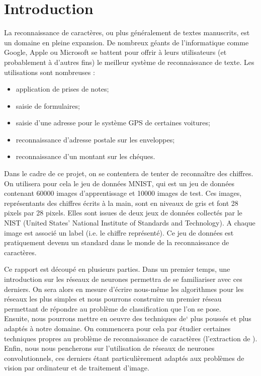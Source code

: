 
\chapter{Introduction}

La reconnaissance de caractères, ou plus généralement de textes manuscrits, est 
un domaine en pleine expansion. 
De nombreux géants de l'informatique comme Google, Apple ou Microsoft se battent pour 
offrir à leurs utilisateurs (et probablement à d'autres fins) le meilleur système 
de reconnaissance de texte. Les utilisations sont nombreuses :
\begin{itemize}
  \item application de prises de notes;
  \item saisie de formulaires;
  \item saisie d'une adresse pour le système GPS de certaines voitures;
  \item reconnaissance d'adresse postale sur les enveloppes;
  \item reconnaissance d'un montant sur les chéques.
\end{itemize}

\vspace{1em}

Dans le cadre de ce projet, on se contentera de tenter de reconnaître des chiffres. 
On utilisera pour cela le jeu de données MNIST, qui est un jeu de données contenant 
60000 images d'apprentissage et 10000 images de test. Ces images, représentants des 
chiffres écrits à la main, sont en niveaux de gris et font 28 pixels par 28 pixels.
Elles sont issues de deux jeux de données collectés par le NIST 
(United States' National Institute of Standards and Technology). 
A chaque image est associé un label (i.e.\/ le chiffre représenté). 
Ce jeu de données est pratiquement devenu un standard dans le monde de la 
reconnaissance de caractères.

Ce rapport est découpé en plusieurs parties. Dans un premier temps, une introduction 
sur les réseaux de neurones permettra de se familiariser avec ces derniers. 
On sera alors en mesure d'écrire nous-même les algorithmes pour les réseaux les 
plus simples et nous pourrons construire un premier réseau permettant de répondre 
au problème de classification que l'on se pose. \\
Ensuite, nous pourrons mettre en oeuvre des techniques de` 
plus poussés et plus adaptés à notre domaine. On commencera pour cela par 
étudier certaines techniques propres au problème de reconnaissance de caractères
(l'extraction de ).
Enfin, nous nous pencherons sur l'utilisation de réseaux de neurones convolutionnels, 
ces derniers étant particulièrement adaptés aux problèmes de vision par ordinateur 
et de traitement d'image.
